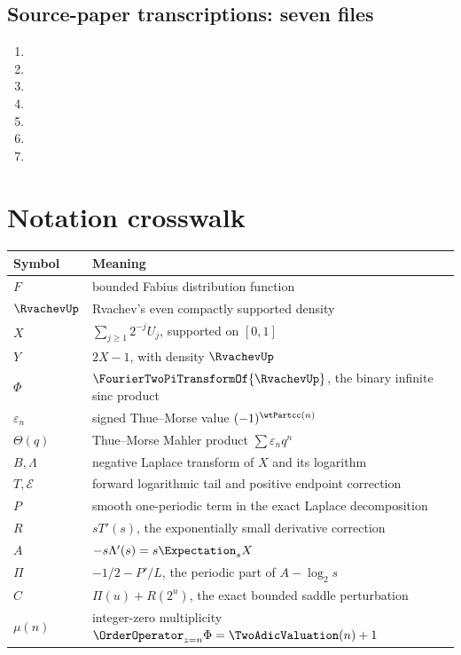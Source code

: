 \documentclass[11pt]{article}
\numberwithin{equation}{section}
\theoremstyle{definition}
\theoremstyle{remark}
\begin{document}
\subsection{Source-paper transcriptions: seven files}
\begin{enumerate}
\item {}
\item {}
\item {}
\item {}
\item {}
\item {}
\item {}
\end{enumerate}

\section{Notation crosswalk}
\begin{center}
\begin{tabularx}{\textwidth}{@{}lX@{}}
\toprule
Symbol & Meaning\\
\midrule
$F$ & bounded Fabius distribution function\\
$\RvachevUp$ & Rvachev's even compactly supported density\\
$X$ & $\sum_{j\ge1}2^{-j}U_j$, supported on $[0,1]$\\
$Y$ & $2X-1$, with density $\RvachevUp$\\
$\Phi$ & $\FourierTwoPiTransformOf{\RvachevUp}$, the binary infinite sinc product\\
$\varepsilon_n$ & signed Thue--Morse value $(-1)^{\wtPartcc(n)}$\\
$\Theta(q)$ & Thue--Morse Mahler product $\sum\varepsilon_nq^n$\\
$B,\Lambda$ & negative Laplace transform of $X$ and its logarithm\\
$T,\mathcal E$ & forward logarithmic tail and positive endpoint correction\\
$P$ & smooth one-periodic term in the exact Laplace decomposition\\
$R$ & $sT'(s)$, the exponentially small derivative correction\\
$A$ & $-s\Lambda'(s)=s\Expectation_sX$\\
$\Pi$ & $-1/2-P'/L$, the periodic part of $A-\log_2s$\\
$C$ & $\Pi(u)+R(2^u)$, the exact bounded saddle perturbation\\
$\mu(n)$ & integer-zero multiplicity $\OrderOperator_{z=n}\Phi=\TwoAdicValuation(n)+1$\\
\bottomrule
\end{tabularx}
\end{center}
\end{document}
